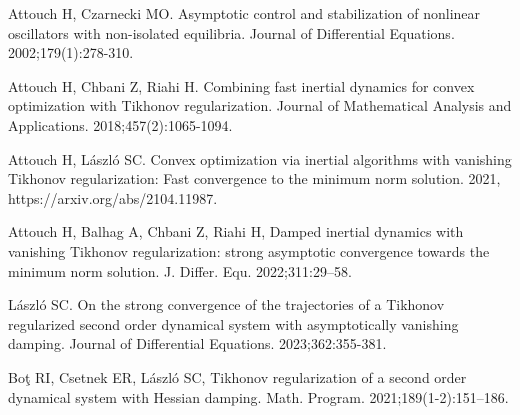 \documentclass[review]{elsarticle}
\begin{document}
\begin{thebibliography}{}
		
		
		
		
		
		
		
		
		Attouch H, Czarnecki MO. Asymptotic control and stabilization of nonlinear oscillators with non-isolated equilibria. Journal of Differential Equations. 2002;179(1):278-310.
		
		Attouch H, Chbani Z, Riahi H. Combining fast inertial dynamics for convex optimization with Tikhonov regularization. Journal of Mathematical Analysis and Applications. 2018;457(2):1065-1094.
		
		Attouch H, László SC. Convex optimization via inertial algorithms with vanishing Tikhonov regularization: Fast convergence to the minimum norm solution. 2021, https://arxiv.org/abs/2104.11987.

		
		
		Attouch H, Balhag A, Chbani Z, Riahi H, Damped inertial dynamics with vanishing Tikhonov regularization: strong asymptotic convergence towards the minimum norm solution. J. Differ. Equ. 2022;311:29–58.
		
		L{\'a}szl{\'o} SC. On the strong convergence of the trajectories of a Tikhonov regularized second order dynamical system with asymptotically vanishing damping. Journal of Differential Equations. 2023;362:355-381.

		 Bo{\c t} RI, Csetnek ER, László SC, Tikhonov regularization of a second order dynamical system with Hessian damping. Math. Program. 2021;189(1-2):151–186.
		

\end{thebibliography}
\end{document}

